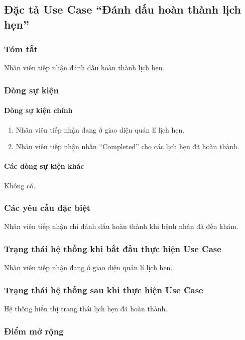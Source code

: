 \subsection{Đặc tả Use Case ``Đánh dấu hoàn thành lịch hẹn''}

\subsubsection{Tóm tắt}
Nhân viên tiếp nhận đánh dấu hoàn thành lịch hẹn.

\subsubsection{Dòng sự kiện}
\paragraph{\textbf{Dòng sự kiện chính}}
\begin{enumerate}
  \item Nhân viên tiếp nhận đang ở giao diện quản lí lịch hẹn.
  \item Nhân viên tiếp nhận nhấn ``Completed'' cho các lịch hẹn đã hoàn thành.
\end{enumerate}

\paragraph{\textbf{Các dòng sự kiện khác}}
Không có.

\subsubsection{Các yêu cầu đặc biệt}
Nhân viên tiếp nhận chỉ đánh dấu hoàn thành khi bệnh nhân đã đến khám.

\subsubsection{Trạng thái hệ thống khi bắt đầu thực hiện Use Case}
Nhân viên tiếp nhận đang ở giao diện quản lí lịch hẹn.

\subsubsection{Trạng thái hệ thống sau khi thực hiện Use Case}
Hệ thống hiển thị trạng thái lịch hẹn đã hoàn thành.

\subsubsection{Điểm mở rộng}